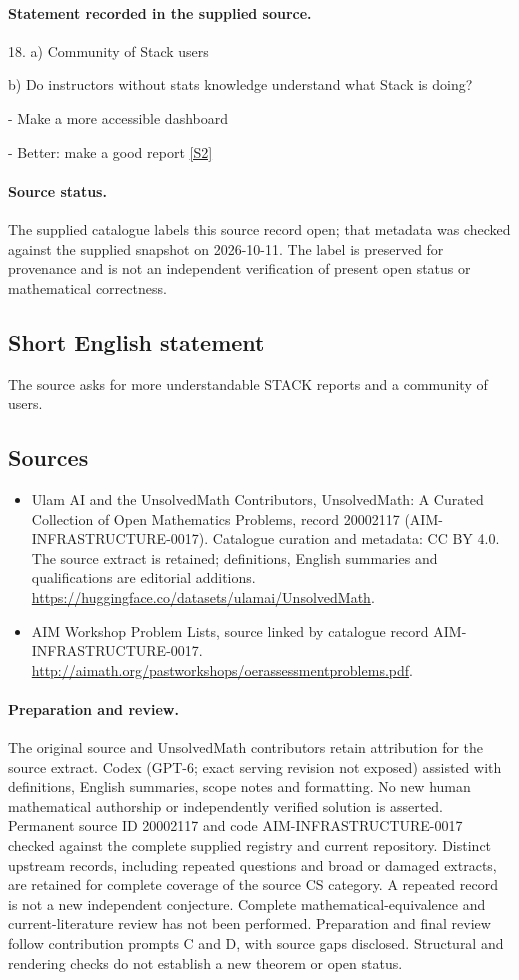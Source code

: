 \documentclass[11pt]{article}
\begin{document}
\paragraph{Statement recorded in the supplied source.}
18. a) Community of Stack users

b) Do instructors without stats knowledge understand what Stack is doing?

- Make a more accessible dashboard

- Better: make a good report \href{http://aimath.org/pastworkshops/oerassessmentproblems.pdf}{[S2]}
\paragraph{Source status.}
The supplied catalogue labels this source record open; that metadata was checked against the supplied snapshot on 2026-10-11. The label is preserved for provenance and is not an independent verification of present open status or mathematical correctness.
\subsection{Short English statement}
The source asks for more understandable STACK reports and a community of users.
\subsection{Sources}
\begin{itemize}
\item[S1] Ulam AI and the UnsolvedMath Contributors, UnsolvedMath: A Curated Collection of Open Mathematics Problems, record 20002117 (AIM-INFRASTRUCTURE-0017). Catalogue curation and metadata: CC BY 4.0. The source extract is retained; definitions, English summaries and qualifications are editorial additions.
\url{https://huggingface.co/datasets/ulamai/UnsolvedMath}.
\item[S2] AIM Workshop Problem Lists, source linked by catalogue record AIM-INFRASTRUCTURE-0017.
\url{http://aimath.org/pastworkshops/oerassessmentproblems.pdf}.
\end{itemize}
\paragraph{Preparation and review.}
The original source and UnsolvedMath contributors retain attribution for the source extract. Codex (GPT-6; exact serving revision not exposed) assisted with definitions, English summaries, scope notes and formatting. No new human mathematical authorship or independently verified solution is asserted. Permanent source ID 20002117 and code AIM-INFRASTRUCTURE-0017 checked against the complete supplied registry and current repository. Distinct upstream records, including repeated questions and broad or damaged extracts, are retained for complete coverage of the source CS category. A repeated record is not a new independent conjecture. Complete mathematical-equivalence and current-literature review has not been performed. Preparation and final review follow contribution prompts C and D, with source gaps disclosed. Structural and rendering checks do not establish a new theorem or open status.
\label{end:20002117}
\end{document}
